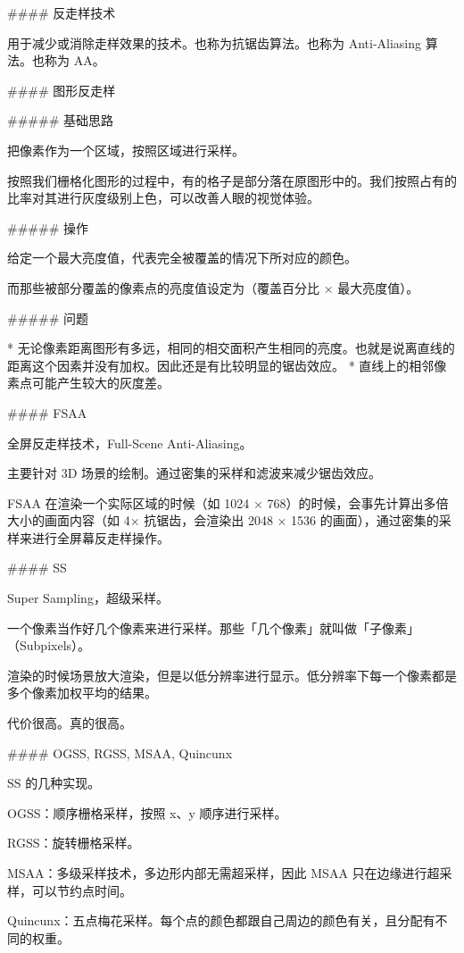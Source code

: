 \documentclass[
]{article}
\newenvironment{Shaded}{}{}
\newcommand{\FunctionTok}[1]{\textcolor[rgb]{0.02,0.16,0.49}{#1}}
\newcommand{\NormalTok}[1]{#1}
\newcommand{\StringTok}[1]{\textcolor[rgb]{0.25,0.44,0.63}{#1}}
\begin{document}
\begin{Shaded}
\begin{Highlighting}[]
\FunctionTok{#### 反走样技术}

\NormalTok{用于减少或消除走样效果的技术。也称为抗锯齿算法。也称为 Anti-Aliasing 算法。也称为 AA。}

\FunctionTok{#### 图形反走样}

\FunctionTok{##### 基础思路}

\NormalTok{把像素作为一个区域，按照区域进行采样。}

\NormalTok{按照我们栅格化图形的过程中，有的格子是部分落在原图形中的。我们按照占有的比率对其进行灰度级别上色，可以改善人眼的视觉体验。}

\FunctionTok{##### 操作}

\NormalTok{给定一个最大亮度值，代表完全被覆盖的情况下所对应的颜色。}

\NormalTok{而那些被部分覆盖的像素点的亮度值设定为（覆盖百分比 × 最大亮度值）。}

\FunctionTok{##### 问题}

\NormalTok{* }\StringTok{无论像素距离图形有多远，相同的相交面积产生相同的亮度。也就是说离直线的距离这个因素并没有加权。因此还是有比较明显的锯齿效应。}
\StringTok{* 直线上的相邻像素点可能产生较大的灰度差。}

\FunctionTok{#### FSAA}

\NormalTok{全屏反走样技术，Full-Scene Anti-Aliasing。}

\NormalTok{主要针对 3D 场景的绘制。通过密集的采样和滤波来减少锯齿效应。}

\NormalTok{FSAA 在渲染一个实际区域的时候（如 1024 × 768）的时候，会事先计算出多倍大小的画面内容（如 4× 抗锯齿，会渲染出 2048 × 1536 的画面），通过密集的采样来进行全屏幕反走样操作。}

\FunctionTok{#### SS}

\NormalTok{Super Sampling，超级采样。}

\NormalTok{一个像素当作好几个像素来进行采样。那些「几个像素」就叫做「子像素」（Subpixels）。}

\NormalTok{渲染的时候场景放大渲染，但是以低分辨率进行显示。低分辨率下每一个像素都是多个像素加权平均的结果。}

\NormalTok{代价很高。真的很高。}

\FunctionTok{#### OGSS, RGSS, MSAA, Quincunx}

\NormalTok{SS 的几种实现。}

\NormalTok{OGSS：顺序栅格采样，按照 x、y 顺序进行采样。}

\NormalTok{RGSS：旋转栅格采样。}

\NormalTok{MSAA：多级采样技术，多边形内部无需超采样，因此 MSAA 只在边缘进行超采样，可以节约点时间。}

\NormalTok{Quincunx：五点梅花采样。每个点的颜色都跟自己周边的颜色有关，且分配有不同的权重。}
\end{Highlighting}
\end{Shaded}
\end{document}
